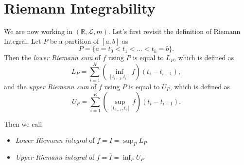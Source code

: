 \section{Riemann Integrability}
We are now working in \((\mathbb{R} , \mathcal{L} , m)\). Let's first revisit the definition of
Riemann Integral. Let \(P\) be a partition of \([a, b]\) as
\[
	P = \{a = t_0 < t_1 < \dots < t_k = b \}.
\]
Then the \emph{lower Riemann sum} of \(f\) using \(P\) is equal to \(L_P\), which is defined as
\[
	L_{P} = \sum\limits_{i=1}^{K} \left(\inf _{[t_{i-1}, t_{i}]} f \right)(t_{i} - t_{i - 1}),
\]
and the \emph{upper Riemann sum} of \(f\) using \(P\) is equal to \(U_P\), which is defined as
\[
	U_{P} = \sum\limits_{i=1}^{K} \left(\sup _{[t_{i-1}, t_{i}]} f \right)(t_{i} - t_{i - 1}).
\]

Then we call
\begin{itemize}
	\item \emph{Lower Riemann integral} of \(f = \underline{I} = \sup_P L_{P} \)
	\item \emph{Upper Riemann integral} of \(f = \overline{I}  = \inf_P U_{P} \)
\end{itemize}

